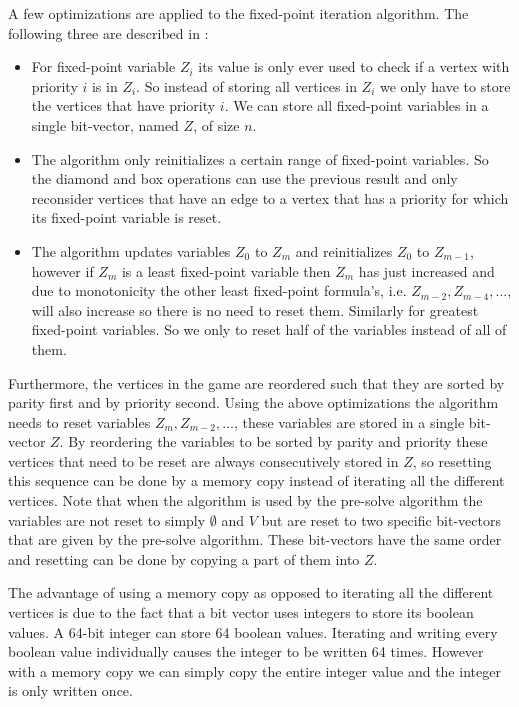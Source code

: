 A few optimizations are applied to the fixed-point iteration algorithm. The following three are described in \cite{FPITE}:
\begin{itemize}
	\item For fixed-point variable $Z_i$ its value is only ever used to check if a vertex with priority $i$ is in $Z_i$. So instead of storing all vertices in $Z_i$ we only have to store the vertices that have priority $i$. We can store all fixed-point variables in a single bit-vector, named $Z$, of size $n$.
	\item The algorithm only reinitializes a certain range of fixed-point variables. So the diamond and box operations can use the previous result and only reconsider vertices that have an edge to a vertex that has a priority for which its fixed-point variable is reset.
	\item The algorithm updates variables $Z_0$ to $Z_m$ and reinitializes $Z_0$ to $Z_{m-1}$, however if $Z_m$ is a least fixed-point variable then $Z_m$ has just increased and due to monotonicity the other least fixed-point formula's, i.e. $Z_{m-2},Z_{m-4},\dots$, will also increase so there is no need to reset them. Similarly for greatest fixed-point variables. So we only to reset half of the variables instead of all of them.
\end{itemize}
Furthermore, the vertices in the game are reordered such that they are sorted by parity first and by priority second. Using the above optimizations the algorithm needs to reset variables $Z_{m}, Z_{m-2},\dots$, these variables are stored in a single bit-vector $Z$. By reordering the variables to be sorted by parity and priority these vertices that need to be reset are always consecutively stored in $Z$, so resetting this sequence can be done by a memory copy instead of iterating all the different vertices. Note that when the algorithm is used by the pre-solve algorithm the variables are not reset to simply $\emptyset$ and $V$ but are reset to two specific bit-vectors that are given by the pre-solve algorithm. These bit-vectors have the same order and resetting can be done by copying a part of them into $Z$.

The advantage of using a memory copy as opposed to iterating all the different vertices is due to the fact that a bit vector uses integers to store its boolean values. A 64-bit integer can store 64 boolean values. Iterating and writing every boolean value individually causes the integer to be written 64 times. However with a memory copy we can simply copy the entire integer value and the integer is only written once.

